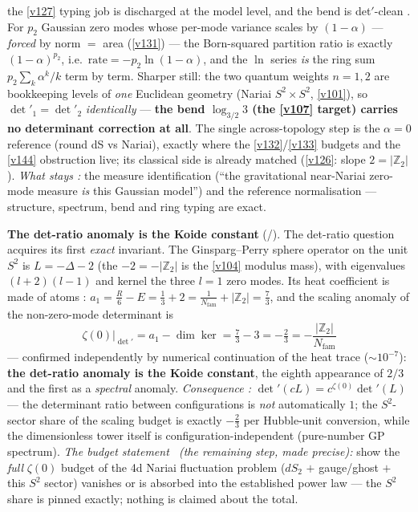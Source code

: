 \documentclass[11pt,a4paper]{article}
\newcommand{\Z}{\mathbb{Z}}
\newcommand{\Nfam}{N_{\mathrm{fam}}}
\begin{document}
the \vref{v127} typing job is discharged at the model level, and the bend is det$'$-clean \mE. For
$p_2$ Gaussian zero modes whose per-mode variance scales by $(1-\alpha)$ --- \emph{forced} by
norm $=$ area (\vref{v131}) --- the Born-squared partition ratio is exactly $(1-\alpha)^{p_2}$, i.e.\
$\mathrm{rate}=-p_2\ln(1-\alpha)$, and the $\ln$ series \emph{is} the ring sum $p_2\sum_k\alpha^k/k$
term by term. Sharper still: the two quantum weights $n=1,2$ are bookkeeping levels of \emph{one}
Euclidean geometry (Nariai $S^2{\times}S^2$, \vref{v101}), so $\det'_1=\det'_2$ \emph{identically} ---
\textbf{the bend $\log_{3/2}3$ (the \vref{v107} target) carries no determinant correction at all}. The
single across-topology step is the $\alpha=0$ reference (round dS vs Nariai), exactly where the
\vref{v132}/\vref{v133} budgets and the \vref{v144} obstruction live; its classical side is already
matched (\vref{v126}: slope $2=|\Z_2|$). \emph{What stays \mC:} the measure identification
(``the gravitational near-Nariai zero-mode measure \emph{is} this Gaussian model'') and the reference
normalisation --- structure, spectrum, bend and ring typing are exact.


\par\smallskip\noindent\textbf{The det-ratio anomaly is the Koide constant} (\mE/\mC).
The det-ratio question acquires its first \emph{exact} invariant. The Ginsparg--Perry sphere operator
on the unit $S^2$ is $L=-\Delta-2$ (the $-2=-|\Z_2|$ is the \vref{v104} modulus mass), with eigenvalues
$(l{+}2)(l{-}1)$ and kernel the three $l{=}1$ zero modes. Its heat coefficient is made of atoms \mE:
$a_1=\tfrac R6-E=\tfrac13+2=\tfrac1{\Nfam}+|\Z_2|=\tfrac73$, and the scaling anomaly of the
non-zero-mode determinant is
\[
  \boxed{\ \zeta(0)\big|_{\det'}=a_1-\dim\ker=\tfrac73-3=-\tfrac23=-\frac{|\Z_2|}{\Nfam}\ }
\]
--- confirmed independently by numerical continuation of the heat trace ($\sim10^{-7}$): \textbf{the
det-ratio anomaly is the Koide constant}, the eighth appearance of $2/3$ and the first as a
\emph{spectral} anomaly. \emph{Consequence \mE:} $\det'(cL)=c^{\zeta(0)}\det'(L)$ --- the determinant
ratio between configurations is \emph{not} automatically $1$; the $S^2$-sector share of the scaling
budget is exactly $-\tfrac23$ per Hubble-unit conversion, while the dimensionless tower itself is
configuration-independent (pure-number GP spectrum). \emph{The budget statement \mC\ (the remaining
step, made precise):} show the \emph{full} $\zeta(0)$ budget of the 4d Nariai fluctuation problem
($dS_2$ $+$ gauge/ghost $+$ this $S^2$ sector) vanishes or is absorbed into the established power law
--- the $S^2$ share is pinned exactly; nothing is claimed about the total. 
\end{document}
